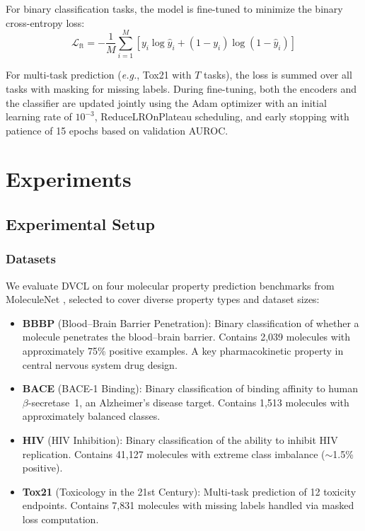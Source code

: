 \documentclass[a4paper,fleqn]{cas-sc}
\newcommand{\eg}{\textit{e.g.}}
\begin{document}
For binary classification tasks, the model is fine-tuned to minimize the binary cross-entropy loss:
\begin{equation}\label{eq:bce_loss}
\mathcal{L}_{\text{ft}} = -\frac{1}{M} \sum_{i=1}^{M} \left[ y_i \log \hat{y}_i + (1 - y_i) \log (1 - \hat{y}_i) \right]
\end{equation}

For multi-task prediction (\eg, Tox21 with $T$ tasks), the loss is summed over all tasks with masking for missing labels. During fine-tuning, both the encoders and the classifier are updated jointly using the Adam optimizer with an initial learning rate of $10^{-3}$, ReduceLROnPlateau scheduling, and early stopping with patience of 15 epochs based on validation AUROC.


\section{Experiments}\label{sec:experiments}

\subsection{Experimental Setup}\label{sec:setup}

\subsubsection{Datasets}

We evaluate DVCL on four molecular property prediction benchmarks from MoleculeNet \citep{wu2018moleculenet}, selected to cover diverse property types and dataset sizes:

\begin{itemize}
\item \textbf{BBBP} (Blood--Brain Barrier Penetration): Binary classification of whether a molecule penetrates the blood--brain barrier. Contains 2,039 molecules with approximately 75\% positive examples. A key pharmacokinetic property in central nervous system drug design.

\item \textbf{BACE} (BACE-1 Binding): Binary classification of binding affinity to human $\beta$-secretase~1, an Alzheimer's disease target. Contains 1,513 molecules with approximately balanced classes.

\item \textbf{HIV} (HIV Inhibition): Binary classification of the ability to inhibit HIV replication. Contains 41,127 molecules with extreme class imbalance ($\sim$1.5\% positive).

\item \textbf{Tox21} (Toxicology in the 21st Century): Multi-task prediction of 12 toxicity endpoints. Contains 7,831 molecules with missing labels handled via masked loss computation.
\end{itemize}
\end{document}
